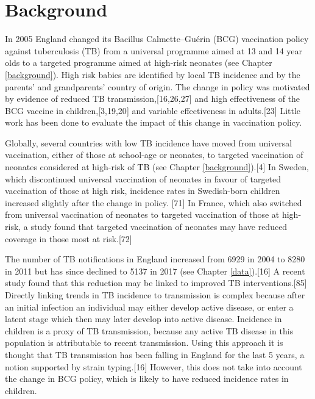 \documentclass[11pt,twoside]{bristolthesis}
\begin{document}
  \hypertarget{background-5}{%
  \section{Background}\label{background-5}}
  
  In 2005 England changed its Bacillus Calmette--Guérin (BCG) vaccination policy against tuberculosis (TB) from a universal programme aimed at 13 and 14 year olds to a targeted programme aimed at high-risk neonates (see Chapter \ref{background}). High risk babies are identified by local TB incidence and by the parents' and grandparents' country of origin. The change in policy was motivated by evidence of reduced TB transmission,{[}16,26,27{]} and high effectiveness of the BCG vaccine in children,{[}3,19,20{]} and variable effectiveness in adults.{[}23{]} Little work has been done to evaluate the impact of this change in vaccination policy.
  
  Globally, several countries with low TB incidence have moved from universal vaccination, either of those at school-age or neonates, to targeted vaccination of neonates considered at high-risk of TB (see Chapter \ref{background}).{[}4{]} In Sweden, which discontinued universal vaccination of neonates in favour of targeted vaccination of those at high risk, incidence rates in Swedish-born children increased slightly after the change in policy. {[}71{]} In France, which also switched from universal vaccination of neonates to targeted vaccination of those at high-risk, a study found that targeted vaccination of neonates may have reduced coverage in those most at risk.{[}72{]}
  
  The number of TB notifications in England increased from 6929 in 2004 to 8280 in 2011 but has since declined to 5137 in 2017 (see Chapter \ref{data}).{[}16{]} A recent study found that this reduction may be linked to improved TB interventions.{[}85{]} Directly linking trends in TB incidence to transmission is complex because after an initial infection an individual may either develop active disease, or enter a latent stage which then may later develop into active disease. Incidence in children is a proxy of TB transmission, because any active TB disease in this population is attributable to recent transmission. Using this approach it is thought that TB transmission has been falling in England for the last 5 years, a notion supported by strain typing.{[}16{]} However, this does not take into account the change in BCG policy, which is likely to have reduced incidence rates in children.
  
\end{document}
